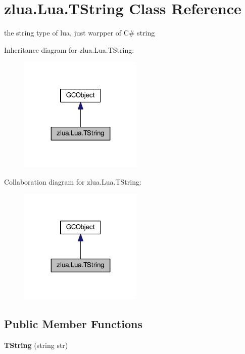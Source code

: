\hypertarget{classzlua_1_1_lua_1_1_t_string}{}\section{zlua.\+Lua.\+T\+String Class Reference}
\label{classzlua_1_1_lua_1_1_t_string}


the string type of lua, just warpper of C\# string  




Inheritance diagram for zlua.\+Lua.\+T\+String\+:
\nopagebreak
\begin{figure}[H]
\begin{center}
\leavevmode
\includegraphics[width=167pt]{classzlua_1_1_lua_1_1_t_string__inherit__graph}
\end{center}
\end{figure}


Collaboration diagram for zlua.\+Lua.\+T\+String\+:
\nopagebreak
\begin{figure}[H]
\begin{center}
\leavevmode
\includegraphics[width=167pt]{classzlua_1_1_lua_1_1_t_string__coll__graph}
\end{center}
\end{figure}
\subsection*{Public Member Functions}
\begin{DoxyCompactItemize}
\item 
\mbox{\label{classzlua_1_1_lua_1_1_t_string_ae0eff8367112eaeabc8febf47dadcc02}} 
{\bfseries T\+String} (string str)
\end{DoxyCompactItemize}
